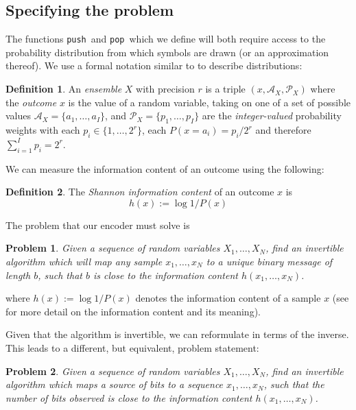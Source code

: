 \documentclass{article}
\newtheorem{problem}{Problem}
\theoremstyle{definition}
\newtheorem{definition}{Definition}
\newcommand{\push}{\texttt{push}}
\newcommand{\pop}{\texttt{pop}}
\begin{document}
\subsection{Specifying the problem}
The functions \push\ and \pop\ which we define will both require access to the
probability distribution from which symbols are drawn (or an approximation
thereof). We use a formal notation similar to \citet{mackay2003} to describe
distributions:
\begin{definition}
  An \emph{ensemble} \(X\) with precision \(r\) is a triple \((x,
  \mathcal{A}_X, \mathcal{P}_X)\) where the \emph{outcome} \(x\) is the value
  of a random variable, taking on one of a set of possible values
  \(\mathcal{A}_X = \{a_1, \ldots, a_I\}\), and \(\mathcal{P}_X = \{p_1,
  \ldots, p_I\}\) are the \emph{integer-valued} probability weights with each
  \(p_i\in\{1, \ldots, 2^r\}\), each \(P(x=a_i) = p_i / 2^r\) and therefore
  \(\sum_{i=1}^Ip_i = 2^r\).
\end{definition}
We can measure the information content of an outcome using the following:
\begin{definition}
  The \emph{Shannon information content} of an outcome \(x\) is
  \begin{equation}
    h(x) := \log 1 / P(x)
  \end{equation}
\end{definition}

The problem that our encoder must solve is

\begin{problem}\label{prob:default}
  Given a sequence of random variables \(X_1, \ldots, X_N\), find an invertible
  algorithm which will map any sample \(x_1, \ldots, x_N\) to a unique binary
  message of length \(b\), such that \(b\) is close to the information content
  \(h(x_1, \ldots, x_N)\).
\end{problem}
where \(h(x) := \log 1 / P(x)\) denotes the information content of a
sample \(x\) (see \cite[Chapter~4]{mackay2003} for more detail on the
information content and its meaning).

Given that the algorithm is invertible, we can reformulate 
in terms of the inverse. This leads to a different, but equivalent, problem
statement:

\begin{problem}\label{prob:alt}
  Given a sequence of random variables \(X_1, \ldots, X_N\), find an invertible
  algorithm which maps a source of bits to a sequence \(x_1, \ldots, x_N\),
  such that the number of bits observed is close to the information content
  \(h(x_1, \ldots, x_N)\).
\end{problem}
\end{document}
